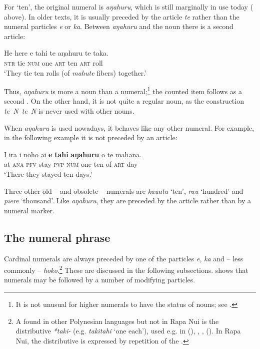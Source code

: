 For ‘ten’, the original numeral is \textit{{\ꞌ}aŋahuru}, which is still marginally in use today ( above). In older texts, it is usually preceded by the article \textit{te} rather than the numeral particles \textit{e} or \textit{ka}. Between \textit{{\ꞌ}aŋahuru} and the noun there is a second article:

\ea\label{ex:4.23}
\gll He here e tahi te {\ꞌ}aŋahuru te taka.\\
\textsc{ntr} tie \textsc{num} one \textsc{art} ten \textsc{art} roll\\

\glt
‘They tie ten rolls (of \textit{mahute} fibers) together.’ \textstyleExampleref{[Ley-5-05.002]}
\z

Thus, \textit{{\ꞌ}aŋahuru} is more a noun than a numeral;\footnote{\label{fn:173}It is not unusual for higher numerals to have the status of nouns; see \citet[78]{Dixon2012}.} the counted item follows as a second . On the other hand, it is not quite a regular noun, as the construction \textit{te~N~te~N} is never used with other nouns.

When \textit{{\ꞌ}aŋahuru} is used nowadays, it behaves like any other numeral. For example, in the following example it is not preceded by an article:

\ea\label{ex:4.24}
\gll {\ꞌ}I ira i noho ai \textbf{e} \textbf{tahi} \textbf{{\ꞌ}aŋahuru} o te mahana. \\
at \textsc{ana} \textsc{pfv} stay \textsc{pvp} \textsc{num} one ten of \textsc{art} day \\

\glt
‘There they stayed ten days.’ \textstyleExampleref{[R420.047]} 
\z

Three other old – and obsolete – numerals are \textit{kauatu} ‘ten’, \textit{rau} ‘hundred’ and \textit{pīere} ‘thousand’. Like \textit{{\ꞌ}aŋahuru}, they are preceded by the article rather than by a numeral marker.

\subsection{The numeral phrase}\label{sec:4.3.2}

Cardinal numerals are always preceded by one of the particles \textit{e}, \textit{ka} and – less commonly – \textit{hoko}.\footnote{\label{fn:174}A  found in other Polynesian languages but not in Rapa Nui is the distributive  \textit{*taki-} (e.g. \textit{takitahi} ‘one each’), used e.g. in  (\citealt[182]{LazardPeltzer2000}),  \citep[492]{Stimson1964},  \citep[498]{Bauer1993},  (\citealt[116]{MoselHovdhaugen1992}). In Rapa Nui, the distributive is expressed by repetition of the .} These are discussed in the following subsections.  shows that numerals may be followed by a number of modifying particles.

